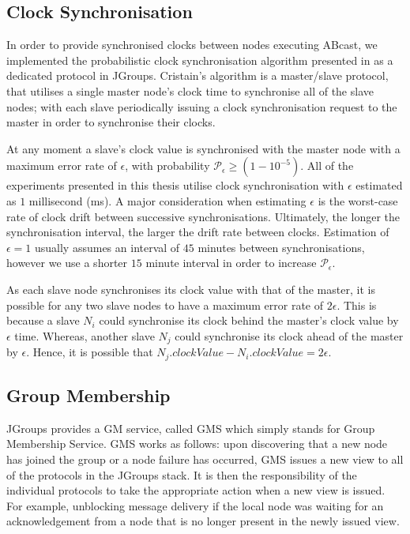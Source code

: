     \subsection{Clock Synchronisation}\label{ssec:clocksynch}
    In order to provide synchronised clocks between nodes executing \textsf{ABcast}, we implemented the probabilistic clock synchronisation algorithm presented in \citep{Cristian:1996:SA:227210.227231} as a dedicated protocol in JGroups.  Cristain's algorithm is a master/slave protocol, that utilises a single master node's clock time to synchronise all of the slave nodes; with each slave periodically issuing a clock synchronisation request to the master in order to synchronise their clocks.  
            
            At any moment a slave's clock value is synchronised with the master node with a maximum error rate of $\epsilon$, with probability $\mathcal{P}_\epsilon \geq (1- 10^{-5})$. All of the experiments presented in this thesis utilise clock synchronisation with $\epsilon$ estimated as $1$ millisecond (ms).  A major consideration when estimating $\epsilon$ is the worst-case rate of clock drift between successive synchronisations. Ultimately, the longer the synchronisation interval, the larger the drift rate between clocks.  Estimation of $\epsilon = 1$ usually assumes an interval of $45$ minutes between synchronisations, however we use a shorter $15$ minute interval in order to increase $\mathcal{P}_\epsilon$.
            
            As each slave node synchronises its clock value with that of the master, it is possible for any two slave nodes to have a maximum error rate of $2\epsilon$.  This is because a slave $N_i$ could synchronise its clock behind the master's clock value by $\epsilon$ time.  Whereas, another slave $N_j$ could synchronise its clock ahead of the master by $\epsilon$. Hence, it is possible that $N_j.clockValue - N_i.clockValue = 2\epsilon$.  

    \subsection{Group Membership}\label{ssec:jgroups_gm}
    JGroups provides a GM service, called GMS which simply stands for Group Membership Service. GMS works as follows: upon discovering that a new node has joined the group or a node failure has occurred, GMS issues a new view to all of the protocols in the JGroups stack.  It is then the responsibility of the individual protocols to take the appropriate action when a new view is issued.  For example, unblocking message delivery if the local node was waiting for an acknowledgement from a node that is no longer present in the newly issued view.     
    
